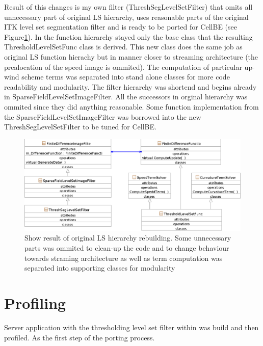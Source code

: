Result of this changes is my own filter (ThreshSegLevelSetFilter) that omits all unnecessary part of original LS hierarchy, uses reasonable parts of the original ITK level set segmentation filter and is ready to be ported for CellBE (see Figure\ref{fg:resultingFilter}). In the function hierarchy stayed only the base class that the resulting ThresholdLevelSetFunc class is derived. This new class does the same job as original LS function hierachy but in manner closer to streaming architecture (the prealocation of the speed image is ommited). The computation of particular up-wind scheme terms was separated into stand alone classes for more code readability and modularity. The filter hierarchy was shortend and begins already in SparseFieldLevelSetImageFilter. All the successors in orginal hierarchy was ommited since they did anything reasonable. Some function implementation from the SparseFieldLevelSetImageFilter was borrowed into the new ThreshSegLevelSetFilter to be tuned for CellBE.

\begin{figure}
    \centering
    \includegraphics[width=15cm]{data/resultingFilter}
    \caption[Resulting level set filter ready to be ported to CellBE]{Show result of original LS hierarchy rebuilding. Some unnecessary parts was ommited to clean-up the code and to change behaviour towards straming architecture as well as term computation was separated into supporting classes for modularity}
    \label{fg:resultingFilter}
\end{figure}

\section{Profiling}

Server application with the thresholding level set filter within was build and then profiled. As the first step of the porting process.

